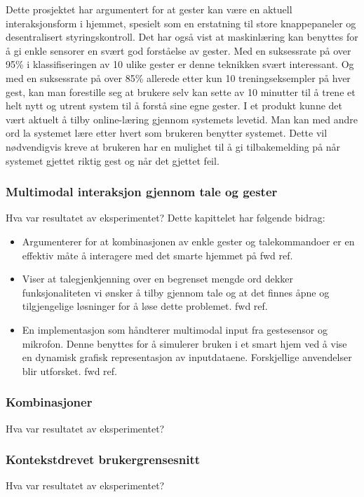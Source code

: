 Dette prosjektet har argumentert for at gester kan være en aktuell interaksjonsform i hjemmet, spesielt som en erstatning til store knappepaneler og desentralisert styringskontroll. Det har også vist at maskinlæring kan benyttes for å gi enkle sensorer en svært god forståelse av gester. Med en suksessrate på over 95\% i klassifiseringen av 10 ulike gester er denne teknikken svært interessant. Og med en suksessrate på over 85\% allerede etter kun 10 treningseksempler på hver gest, kan man forestille seg at brukere selv kan sette av 10 minutter til å trene et helt nytt og utrent system til å forstå sine egne gester. I et produkt kunne det vært aktuelt å tilby online-læring gjennom systemets levetid. Man kan med andre ord la systemet lære etter hvert som brukeren benytter systemet. Dette vil nødvendigvis kreve at brukeren har en mulighet til å gi tilbakemelding på når systemet gjettet riktig gest og når det gjettet feil.

\subsubsection{Multimodal interaksjon gjennom tale og gester}
{\color{red}Hva var resultatet av eksperimentet?}
Dette kapittelet har følgende bidrag:
\begin{itemize}
\item Argumenterer for at kombinasjonen av enkle gester og talekommandoer er en effektiv måte å interagere med det smarte hjemmet på {\color{red} fwd ref}.
\item Viser at talegjenkjenning over en begrenset mengde ord dekker funksjonaliteten vi ønsker å tilby gjennom tale og at det finnes åpne og tilgjengelige løsninger for å løse dette problemet.{\color{red} fwd ref}.
\item En implementasjon som håndterer multimodal input fra gestesensor og mikrofon. Denne benyttes for å simulerer bruken i et smart hjem ved å vise en dynamisk grafisk representasjon av inputdataene. Forskjellige anvendelser blir utforsket. {\color{red} fwd ref}.
\end{itemize}

\subsubsection{Kombinasjoner}
{\color{red}Hva var resultatet av eksperimentet?}

\subsubsection{Kontekstdrevet brukergrensesnitt}
{\color{red}Hva var resultatet av eksperimentet?}
